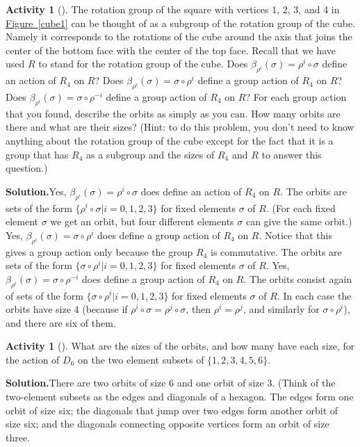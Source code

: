 \documentclass[10pt,]{book}
\theoremstyle{plain}
\theoremstyle{definition}
\newtheorem{activity}[project]{Activity}
\numberwithin{equation}{chapter}
\begin{document}
\begin{activity}[]\label{cosets1}
The rotation group of the square with vertices 1, 2, 3, and 4 in \hyperref[cube1]{Figure~\ref{cube1}} can be thought of as a subgroup of the rotation group of the cube. Namely it corresponds to the rotations of the cube around the axis that joins the center of the bottom face with the center of the top face. Recall that we have used \(R\) to stand for the rotation group of the cube. Does \(\beta_{\rho^i}(\sigma)=\rho^i\circ
\sigma\) define an action of \(R_4\) on \(R\)? Does \(\beta_{\rho^i}(\sigma) =
\sigma\circ\rho^i\) define a group action of \(R_4\) on \(R\)? Does \(\beta_{\rho^i}(\sigma) =
\sigma\circ\rho^{-i}\) define a group action of \(R_4\) on \(R\)? For each group action that you found, describe the orbits as simply as you can. How many orbits are there and what are their sizes? (Hint: to do this problem, you don't need to know anything about the rotation group of the cube except for the fact that it is a group that has \(R_4\) as a subgroup and the sizes of \(R_4\) and \(R\) to answer this question.)%
\par\medskip\noindent%
\textbf{Solution.}\quad Yes, \(\beta_{\rho^i}(\sigma)=\rho^i\circ
\sigma\) does define an action of \(R_4\) on \(R\). The orbits are sets of the form \(\{\rho^i\circ\sigma|i=0,1,2,3\}\) for fixed elements \(\sigma\) of \(R\). (For each fixed element \(\sigma\) we get an orbit, but four different elements \(\sigma\) can give the same orbit.) Yes, \(\beta_{\rho^i}(\sigma) =
\sigma\circ\rho^{i}\) does define a group action of \(R_4\) on \(R\). Notice that this gives a group action only because the group \(R_4\) is commutative. The orbits are sets of the form \(\{\sigma\circ\rho^i|i=0,1,2,3\}\) for fixed elements \(\sigma\) of \(R\). Yes, \(\beta_{\rho^i}(\sigma) =
\sigma\circ\rho^{-i}\) does define a group action of \(R_4\) on \(R\). The orbits consist again of sets of the form \(\{\sigma\circ\rho^i|i=0,1,2,3\}\) for fixed elements \(\sigma\) of \(R\). In each case the orbits have size 4 (because if \(\rho^i\circ\sigma=\rho^j\circ\sigma\), then \(\rho^i =\rho^j\), and similarly for \(\sigma\circ\rho^i\)), and there are six of them.%
\end{activity}
\begin{activity}[]\label{activity-290}
What are the sizes of the orbits, and how many have each size, for the action of \(D_6\) on the two element subsets of \(\{1,2,3,4,5,6\}\).%
\par\medskip\noindent%
\textbf{Solution.}\quad There are two orbits of size 6 and one orbit of size 3. (Think of the two-element subsets as the edges and diagonals of a hexagon. The edges form one orbit of size six; the diagonals that jump over two edges form another orbit of size six; and the diagonals connecting opposite vertices form an orbit of size three.%
\end{activity}
\end{document}
